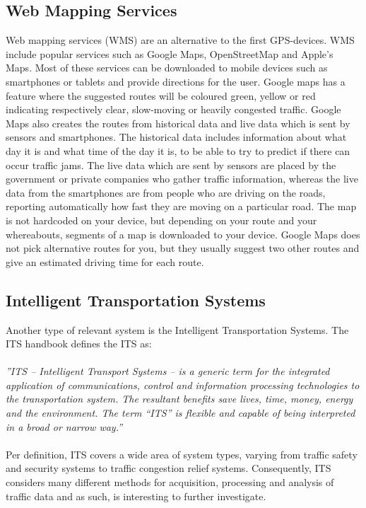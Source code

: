 \subsection*{Web Mapping Services}
Web mapping services (WMS) are an alternative to the first GPS-devices. WMS include popular services such as Google Maps, OpenStreetMap and Apple's Maps. Most of these services can be downloaded to mobile devices such as smartphones or tablets and provide directions for the user. Google maps has a feature where the suggested routes will be coloured green, yellow or red indicating respectively clear, slow-moving or heavily congested traffic.
Google Maps also creates the routes from historical data and live data which is sent by sensors and smartphones\cite{Googleabout}. The historical data includes information about what day it is and what time of the day it is, to be able to try to predict if there can occur traffic jams. The live data which are sent by sensors are placed by the government or private companies who gather traffic information, whereas the live data from the smartphones are from people who are driving on the roads, reporting automatically how fast they are moving on a particular road. The map is not hardcoded on your device, but depending on your route and your whereabouts, segments of a map is downloaded to your device. Google Maps does not pick alternative routes for you, but they usually suggest two other routes and give an estimated driving time for each route\cite{Ncta}.

\subsection*{Intelligent Transportation Systems}\label{sec:ITS}
Another type of relevant system is the Intelligent Transportation Systems. The ITS handbook\cite{PIAR07} defines the ITS as:
\\\\
\emph{''ITS – Intelligent Transport Systems – is a generic term for the integrated application of
communications, control and information processing technologies to the transportation system. The
resultant benefits save lives, time, money, energy and the environment. The term “ITS” is flexible and
capable of being interpreted in a broad or narrow way.''}
\\\\
Per definition, ITS covers a wide area of system types, varying from traffic safety and security systems to traffic congestion relief systems. Consequently, ITS considers many different methods for acquisition, processing and analysis of traffic data and as such, is interesting to further investigate.

